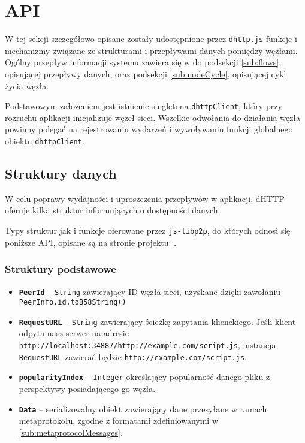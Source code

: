 \section{API}
\label{sec:api}

W tej sekcji szczegółowo opisane zostały udostępnione przez \texttt{dhttp.js} funkcje i mechanizmy związane ze strukturami i przepływami danych pomiędzy węzłami. Ogólny przepływ informacji systemu zawiera się w do podsekcji \ref{sub:flows}, opisującej przepływy danych, oraz podsekcji \ref{sub:nodeCycle}, opisującej cykl życia węzła.

Podstawowym założeniem jest istnienie singletona \texttt{dhttpClient}, który przy rozruchu aplikacji inicjalizuje węzeł sieci. Wszelkie odwołania do działania węzła powinny polegać na rejestrowaniu wydarzeń i wywoływaniu funkcji globalnego obiektu \texttt{dhttpClient}.

\subsection{Struktury danych}
W celu poprawy wydajności i uproszczenia przepływów w aplikacji, dHTTP oferuje kilka struktur informujących o dostępności danych.

Typy struktur jak i funkcje oferowane przez \texttt{js-libp2p}, do których odnosi się poniższe API, opisane są na stronie projektu: \cite{libp2pReadme}.

\subsubsection{Struktury podstawowe}
\begin{itemize}
    \item \textbf{\texttt{PeerId}} -- \texttt{String} zawierający ID węzła sieci, uzyskane dzięki zawołaniu \texttt{PeerInfo.id.toB58String()}
    \item \textbf{\texttt{RequestURL}} -- \texttt{String} zawierający ścieżkę zapytania klienckiego. Jeśli klient odpyta nasz serwer na adresie \texttt{http://localhost:34887/http://example.com/script.js}, instancja \texttt{RequestURL} zawierać będzie \texttt{http://example.com/script.js}.
    \item \textbf{\texttt{popularityIndex}} -- \texttt{Integer} określający popularność danego pliku z perspektywy posiadającego go węzła.
    \item \textbf{\texttt{Data}} -- serializowalny obiekt zawierający dane przesyłane w ramach metaprotokołu, zgodne z formatami zdefiniowanymi w \ref{sub:metaprotocolMessages}.
\end{itemize}

